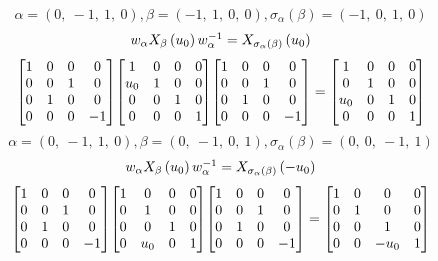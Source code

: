 \documentclass[11pt]{article}
\theoremstyle{definition}
\begin{document}
\[
\alpha = \left( 0, \  -1, \  1, \  0\right), \beta = \left( -1, \  1, \  0, \  0\right), \sigma_{\alpha}(\beta) = \left( -1, \  0, \  1, \  0\right)
\]
\[
\scaletoalign{\textwidth}{w_{\alpha} X_{\beta}\left(u_{0}\right) w_{\alpha}^{-1} = X_{\sigma_{\alpha}\left(\beta\right)}\left(u_{0}\right)}
\]
\[
\scaletoalign{\textwidth}{{\left[\begin{matrix}1 & 0 & 0 & 0\\0 & 0 & 1 & 0\\0 & 1 & 0 & 0\\0 & 0 & 0 & -1\end{matrix}\right]} {\left[\begin{matrix}1 & 0 & 0 & 0\\u_{0} & 1 & 0 & 0\\0 & 0 & 1 & 0\\0 & 0 & 0 & 1\end{matrix}\right]} {\left[\begin{matrix}1 & 0 & 0 & 0\\0 & 0 & 1 & 0\\0 & 1 & 0 & 0\\0 & 0 & 0 & -1\end{matrix}\right]} = {\left[\begin{matrix}1 & 0 & 0 & 0\\0 & 1 & 0 & 0\\u_{0} & 0 & 1 & 0\\0 & 0 & 0 & 1\end{matrix}\right]}}
\]
\[
\alpha = \left( 0, \  -1, \  1, \  0\right), \beta = \left( 0, \  -1, \  0, \  1\right), \sigma_{\alpha}(\beta) = \left( 0, \  0, \  -1, \  1\right)
\]
\[
\scaletoalign{\textwidth}{w_{\alpha} X_{\beta}\left(u_{0}\right) w_{\alpha}^{-1} = X_{\sigma_{\alpha}\left(\beta\right)}\left(- u_{0}\right)}
\]
\[
\scaletoalign{\textwidth}{{\left[\begin{matrix}1 & 0 & 0 & 0\\0 & 0 & 1 & 0\\0 & 1 & 0 & 0\\0 & 0 & 0 & -1\end{matrix}\right]} {\left[\begin{matrix}1 & 0 & 0 & 0\\0 & 1 & 0 & 0\\0 & 0 & 1 & 0\\0 & u_{0} & 0 & 1\end{matrix}\right]} {\left[\begin{matrix}1 & 0 & 0 & 0\\0 & 0 & 1 & 0\\0 & 1 & 0 & 0\\0 & 0 & 0 & -1\end{matrix}\right]} = {\left[\begin{matrix}1 & 0 & 0 & 0\\0 & 1 & 0 & 0\\0 & 0 & 1 & 0\\0 & 0 & - u_{0} & 1\end{matrix}\right]}}
\]
\end{document}
